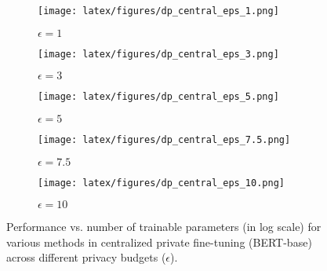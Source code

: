 \begin{figure*}[!h]
    \centering
    \begin{subfigure}{0.49\textwidth}
        \centering
        \texttt{[image: latex/figures/dp\_central\_eps\_1.png]}
        \caption{$\epsilon = 1$}
        \label{fig:dp-central-eps-1}
    \end{subfigure}
    \begin{subfigure}{0.49\textwidth}
        \centering
        \texttt{[image: latex/figures/dp\_central\_eps\_3.png]}
        \caption{$\epsilon = 3$}
        \label{fig:dp-central-eps-3}
    \end{subfigure}
    \begin{subfigure}{0.49\textwidth}
        \centering
        \texttt{[image: latex/figures/dp\_central\_eps\_5.png]}
        \caption{$\epsilon = 5$}
        \label{fig:dp-central-eps-5}
    \end{subfigure}
    \begin{subfigure}{0.49\textwidth}
        \centering
        \texttt{[image: latex/figures/dp\_central\_eps\_7.5.png]}
        \caption{$\epsilon = 7.5$}
        \label{fig:dp-central-eps-7.5}
    \end{subfigure}
    \begin{subfigure}{0.49\textwidth}
        \centering
        \texttt{[image: latex/figures/dp\_central\_eps\_10.png]}
        \caption{$\epsilon = 10$}
        \label{fig:dp-central-eps-10}
    \end{subfigure}
    \caption{Performance vs. number of trainable parameters (in log scale) for various methods in centralized private fine-tuning (BERT-base) across different privacy budgets ($\epsilon$).}
    \label{fig:plots-dp-central-eps}
\end{figure*}


